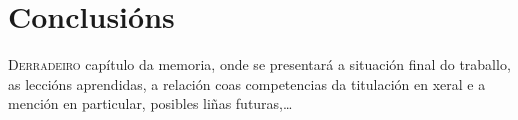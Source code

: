 ﻿\chapter{Conclusións}
\label{chap:conclusions}

\lettrine{D}{erradeiro} capítulo da memoria, onde se presentará a
situación final do traballo, as leccións aprendidas, a relación coas
competencias da titulación en xeral e a mención en particular,
posibles liñas futuras,\dots

\Blindtext
